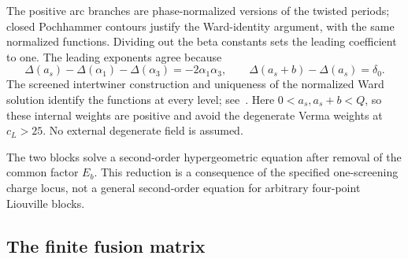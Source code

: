The positive arc branches are phase-normalized versions of
the twisted periods; closed Pochhammer contours justify the
Ward-identity argument, with the same normalized functions.
Dividing out the beta constants sets the leading coefficient
to one. The leading exponents agree because
\[
 \Delta(a_s)-\Delta(\alpha_1)-\Delta(\alpha_3)
   =-2\alpha_1\alpha_3,
 \qquad
 \Delta(a_s+b)-\Delta(a_s)=\delta_0.
\]
The screened intertwiner construction and uniqueness of the
normalized Ward solution identify the functions at every
level; see~\cite[Section~18.1, eq.~(224)]{TeschnerRevisited}.
Here $0<a_s,a_s+b<Q$, so these internal weights are positive
and avoid the degenerate Verma weights at $c_L>25$.
No external degenerate field is assumed.

The two blocks solve a second-order hypergeometric equation
after removal of the common factor $E_b$. This reduction is a
consequence of the specified one-screening charge locus, not
a general second-order equation for arbitrary four-point
Liouville blocks.

\subsection{The finite fusion matrix}

